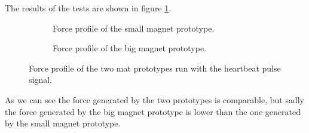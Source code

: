 The results of the tests are shown in figure \ref{fig: Force_vs_magnet_size}.
\begin{figure}
    \centering
    \begin{subfigure}[b]{0.475\textwidth}
        \centering
        \caption{Force profile of the small magnet prototype.}
    \end{subfigure}
    \begin{subfigure}[b]{0.475\textwidth}
        \centering
        \caption{Force profile of the big magnet prototype.}
    \end{subfigure}
    \caption{Force profile of the two mat prototypes run with the heartbeat pulse signal.}
    \label{fig: Force_vs_magnet_size}
\end{figure}

As we can see the force generated by the two prototypes is comparable, but sadly the force generated by the big magnet prototype is lower than the one generated by the small magnet prototype.

